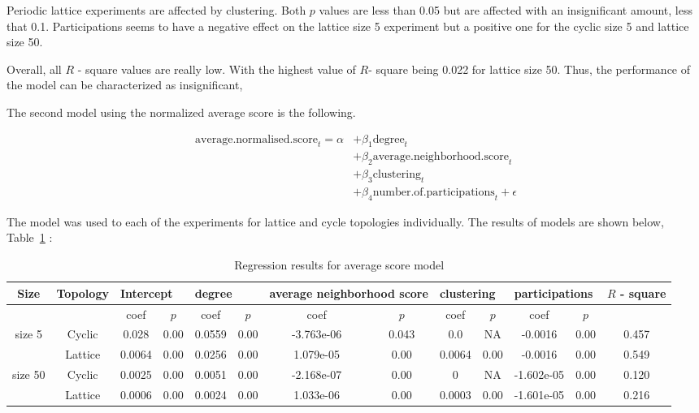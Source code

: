 Periodic lattice experiments are affected by clustering. Both \(p\) values
are less than 0.05 but are affected with an insignificant amount, less that 0.1.
Participations seems to have a negative effect on the lattice size 5 experiment
but a positive one for the cyclic size 5 and lattice size 50.

Overall, all \(R\) - square values  are really low. With the highest value of
\(R\)- square being 0.022 for lattice size 50. Thus, the performance of the
model can be characterized as insignificant,

The second model using the normalized average score is the following.

\begin{align}
	\mathrm{average.normalised.score}_{t} = \alpha
	  & + \beta_{1}  \mathrm{degree}_{t}                              \\
	  & + \beta_{2}  \mathrm{average.neighborhood.score}_{t}          \\
	  & + \beta_{3}  \mathrm{clustering}_{t}                          \\
	  & + \beta_{4}  \mathrm{number.of.participations}_{t} + \epsilon
\end{align}

The model was used to each of the experiments for lattice and cycle topologies
individually. The results of models are shown below, Table~\ref{regression-average} :

\begin{table}[H]
	\centering
	\begin{adjustbox}{width=1\textwidth}
		\small
		\begin{tabular}{ccccccccccccc}
				\toprule
			Size 		& \multicolumn{1}{|l|}{Topology} & \multicolumn{2}{l|}{Intercept} & \multicolumn{2}{l|}{degree} & \multicolumn{2}{l|}{average neighborhood score} & \multicolumn{2}{l|}{clustering} & \multicolumn{2}{l|}{participations} & \(R\) - square \\ \midrule
			        &         & coef   & \(p\)    & coef   & \(p\)    & coef       & \(p\)     & coef   & \(p\)    & coef       & \(p\)     &       \\ \midrule
			size 5  & Cyclic  & 0.028  & 0.00 & 0.0559 & 0.00 & -3.763e-06 & 0.043 & 0.0    & NA   & -0.0016    & 0.00 & 0.457 \\ \midrule
			        & Lattice & 0.0064 & 0.00 & 0.0256 & 0.00 & 1.079e-05  & 0.00  & 0.0064 & 0.00 & -0.0016    & 0.00 & 0.549 \\ \midrule
			size 50 & Cyclic  & 0.0025 & 0.00 & 0.0051 & 0.00 & -2.168e-07 & 0.00  & 0      & NA   & -1.602e-05 & 0.00 & 0.120 \\ \midrule
			        & Lattice & 0.0006 & 0.00 & 0.0024 & 0.00 & 1.033e-06  & 0.00  & 0.0003 & 0.00 & -1.601e-05 & 0.00 & 0.216 \\ \bottomrule
		\end{tabular}
	\end{adjustbox}
	\caption{Regression results for average score model}
	\label{regression-average}
\end{table}

